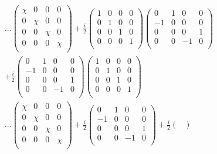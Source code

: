 \documentclass[11pt,a4paper]{article}
\numberwithin{equation}{section}
\begin{document}
	\begin{align*}
	&...\begin{pmatrix}
	\chi & 0 & 0 & 0\\
	0 & \chi & 0 & 0\\
	0 & 0 & \chi & 0 \\
	0 & 0 & 0 & \chi\\
	\end{pmatrix} + \frac{i}{2}\begin{pmatrix}
	1 & 0 & 0 & 0\\
	0 & 1 & 0 & 0\\
	0 & 0 & 1 & 0 \\
	0 & 0 & 0 & 1\\
	\end{pmatrix}\begin{pmatrix}
	0 & 1 & 0 & 0 \\
	-1 & 0 & 0 & 0\\
	0 & 0 & 0 & 1\\
	0 & 0 & -1 & 0\\
	\end{pmatrix}&\\
	&+ \frac{i}{2}\begin{pmatrix}
	0 & 1 & 0 & 0 \\
	-1 & 0 & 0 & 0\\
	0 & 0 & 0 & 1\\
	0 & 0 & -1 & 0\\
	\end{pmatrix}\begin{pmatrix}
	1 & 0 & 0 & 0\\
	0 & 1 & 0 & 0\\
	0 & 0 & 1 & 0 \\
	0 & 0 & 0 & 1\\
	\end{pmatrix}&\\
	&...\begin{pmatrix}
	\chi & 0 & 0 & 0\\
	0 & \chi & 0 & 0\\
	0 & 0 & \chi & 0 \\
	0 & 0 & 0 & \chi\\
	\end{pmatrix} + \frac{i}{2}\begin{pmatrix}
	0 & 1 & 0 & 0 \\
	-1 & 0 & 0 & 0\\
	0 & 0 & 0 & 1\\
	0 & 0 & -1 & 0\\
	\end{pmatrix}  + \frac{i}{2}\begin{pmatrix}

\end{pmatrix}
\end{align*}
\end{document}
